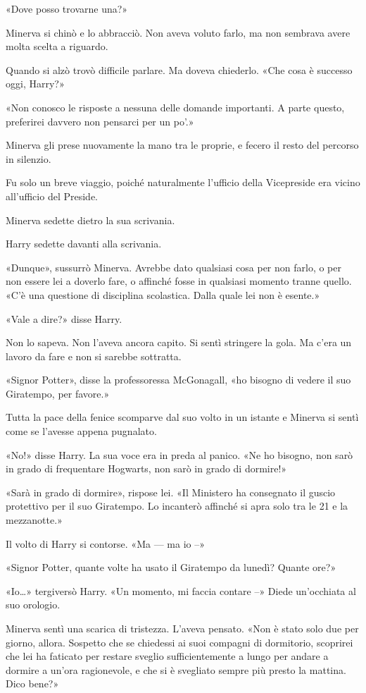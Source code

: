 «Dove posso trovarne una?»

Minerva si chinò e lo abbracciò. Non aveva voluto farlo, ma non sembrava avere molta scelta a riguardo.

Quando si alzò trovò difficile parlare. Ma doveva chiederlo. «Che cosa è successo oggi, Harry?»

«Non conosco le risposte a nessuna delle domande importanti. A parte questo, preferirei davvero non pensarci per un po’.»

Minerva gli prese nuovamente la mano tra le proprie, e fecero il resto del percorso in silenzio.

Fu solo un breve viaggio, poiché naturalmente l’ufficio della Vicepreside era vicino all’ufficio del Preside.

Minerva sedette dietro la sua scrivania.

Harry sedette davanti alla scrivania.

«Dunque», sussurrò Minerva. Avrebbe dato qualsiasi cosa per non farlo, o per non essere lei a doverlo fare, o affinché fosse in qualsiasi momento tranne quello. «C’è una questione di disciplina scolastica. Dalla quale lei non è esente.»

«Vale a dire?» disse Harry.

Non lo sapeva. Non l’aveva ancora capito. Si sentì stringere la gola. Ma c’era un lavoro da fare e non si sarebbe sottratta.

«Signor Potter», disse la professoressa McGonagall, «ho bisogno di vedere il suo Giratempo, per favore.»

Tutta la pace della fenice scomparve dal suo volto in un istante e Minerva si sentì come se l’avesse appena pugnalato.

«No!» disse Harry. La sua voce era in preda al panico. «Ne ho bisogno, non sarò in grado di frequentare Hogwarts, non sarò in grado di dormire!»

«Sarà in grado di dormire», rispose lei. «Il Ministero ha consegnato il guscio protettivo per il suo Giratempo. Lo incanterò affinché si apra solo tra le 21 e la mezzanotte.»

Il volto di Harry si contorse. «Ma — ma io –»

«Signor Potter, quante volte ha usato il Giratempo da lunedì? Quante ore?»

«Io…» tergiversò Harry. «Un momento, mi faccia contare –» Diede un’occhiata al suo orologio.

Minerva sentì una scarica di tristezza. L’aveva pensato. «Non è stato solo due per giorno, allora. Sospetto che se chiedessi ai suoi compagni di dormitorio, scoprirei che lei ha faticato per restare sveglio sufficientemente a lungo per andare a dormire a un’ora ragionevole, e che si è svegliato sempre più presto la mattina. Dico bene?»

